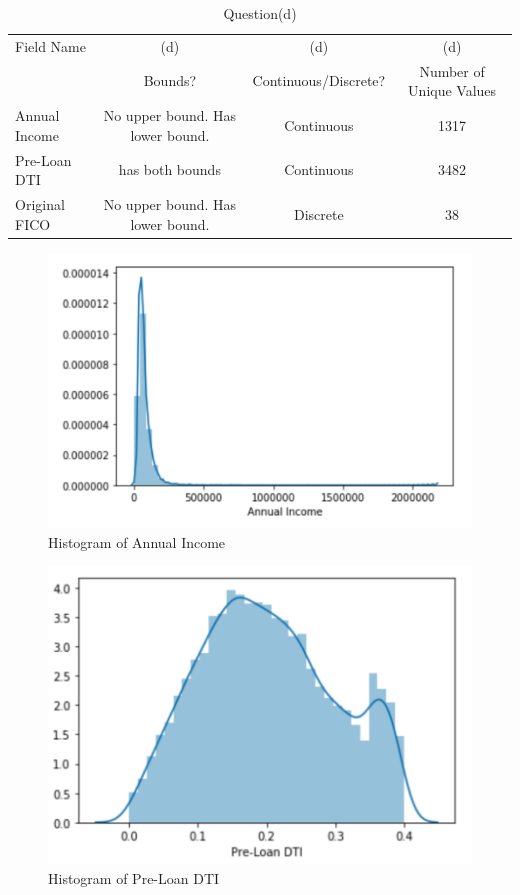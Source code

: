 \documentclass{homework}
\begin{document}
  \begin{table}
\centering
\caption{Question(d)}
    \begin{tabular}{l|c|c|c}
        \hline
    Field Name          & (d)    & (d)  & (d)\\
                       & Bounds? & Continuous/Discrete? & Number of Unique Values \\ \hline
    Annual Income & No upper bound. Has lower bound. & Continuous  & 1317 \\ \hline
    Pre-Loan DTI  & has both bounds & Continuous  & 3482 \\ \hline
    Original FICO & No upper bound. Has lower bound. & Discrete & 38 \\ \hline
    \end{tabular}
\end{table}

\newpage

     \begin{figure}[h!]
    \centering
    \includegraphics[scale=0.50]{"income.png"}
    \caption{Histogram of Annual Income}
    \label{fig:annual income_hist}
    \end{figure}
    
    
       \begin{figure}[h!]
    \centering
    \includegraphics[scale=0.50]{"DTI.png"}
    \caption{Histogram of Pre-Loan DTI}
    \label{fig:pre loan dti_hist}
    \end{figure}
\end{document}

